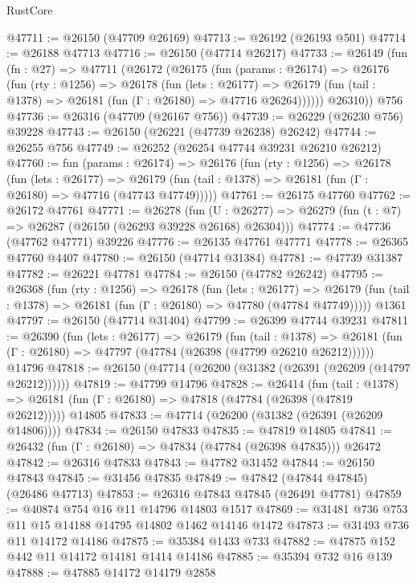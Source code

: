 \begin{lexlean}{RustCore}
\begin{coremodule}
@47711 := @26150 (@47709 @26169)
@47713 := @26192 (@26193 @501)
@47714 := @26188 @47713
@47716 := @26150 (@47714 @26217)
@47733 := @26149
    (fun (fn : @27) =>
    @47711
      (@26172
        (@26175
          (fun (params : @26174) =>
          @26176
            (fun (rty : @1256) =>
            @26178
              (fun (lets : @26177) =>
              @26179 (fun (tail : @1378) => @26181 (fun (Γ : @26180) => @47716 @26264))))))
        @26310))
    @756
@47736 := @26316 (@47709 (@26167 @756))
@47739 := @26229 (@26230 @756) @39228
@47743 := @26150 (@26221 (@47739 @26238) @26242)
@47744 := @26255 @756
@47749 := @26252 (@26254 @47744 @39231 @26210 @26212)
@47760 := fun (params : @26174) =>
  @26176
    (fun (rty : @1256) =>
    @26178
      (fun (lets : @26177) =>
      @26179 (fun (tail : @1378) => @26181 (fun (Γ : @26180) => @47716 (@47743 @47749)))))
@47761 := @26175 @47760
@47762 := @26172 @47761
@47771 := @26278
    (fun (U : @26277) => @26279 (fun (t : @7) => @26287 (@26150 (@26293 @39228 @26168) @26304)))
@47774 := @47736 (@47762 @47771) @39226
@47776 := @26135 @47761 @47771
@47778 := @26365 @47760 @4407
@47780 := @26150 (@47714 @31384)
@47781 := @47739 @31387
@47782 := @26221 @47781
@47784 := @26150 (@47782 @26242)
@47795 := @26368
    (fun (rty : @1256) =>
    @26178
      (fun (lets : @26177) =>
      @26179 (fun (tail : @1378) => @26181 (fun (Γ : @26180) => @47780 (@47784 @47749)))))
    @1361
@47797 := @26150 (@47714 @31404)
@47799 := @26399 @47744 @39231
@47811 := @26390
    (fun (lets : @26177) =>
    @26179
      (fun (tail : @1378) =>
      @26181 (fun (Γ : @26180) => @47797 (@47784 (@26398 (@47799 @26210 @26212))))))
    @14796
@47818 := @26150 (@47714 (@26200 (@31382 (@26391 (@26209 (@14797 @26212))))))
@47819 := @47799 @14796
@47828 := @26414
    (fun (tail : @1378) => @26181 (fun (Γ : @26180) => @47818 (@47784 (@26398 (@47819 @26212)))))
    @14805
@47833 := @47714 (@26200 (@31382 (@26391 (@26209 @14806))))
@47834 := @26150 @47833
@47835 := @47819 @14805
@47841 := @26432 (fun (Γ : @26180) => @47834 (@47784 (@26398 @47835))) @26472
@47842 := @26316 @47833
@47843 := @47782 @31452
@47844 := @26150 @47843
@47845 := @31456 @47835
@47849 := @47842 (@47844 @47845) (@26486 @47713)
@47853 := @26316 @47843 @47845 (@26491 @47781)
@47859 := @40874 @754 @16 @11 @14796 @14803 @1517
@47869 := @31481 @736 @753 @11 @15 @14188 @14795 @14802 @1462 @14146 @1472
@47873 := @31493 @736 @11 @14172 @14186
@47875 := @35384 @1433 @733
@47882 := @47875 @152 @442 @11 @14172 @14181 @1414 @14186
@47885 := @35394 @732 @16 @139
@47888 := @47885 @14172 @14179 @2858

\end{coremodule}
\end{lexlean}
